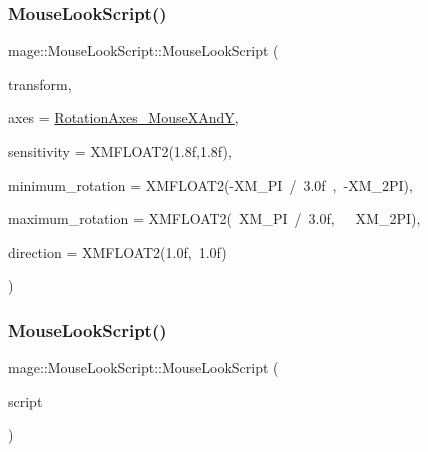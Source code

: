 \subsubsection{\texorpdfstring{Mouse\+Look\+Script()}{MouseLookScript()}\hspace{0.1cm}{\footnotesize\ttfamily [1/3]}}
{\footnotesize\ttfamily mage\+::\+Mouse\+Look\+Script\+::\+Mouse\+Look\+Script (\begin{DoxyParamCaption}\item[{Transform $\ast$}]{transform,  }\item[{\hyperlink{namespacemage_a548e5c31b08a1078841ed21948f5bf4c}{Rotation\+Axes}}]{axes = {\ttfamily \hyperlink{namespacemage_a548e5c31b08a1078841ed21948f5bf4ca6b0dd5cb81f83efb4c2b36456d84750d}{Rotation\+Axes\+\_\+\+Mouse\+X\+AndY}},  }\item[{const X\+M\+F\+L\+O\+A\+T2 \&}]{sensitivity = {\ttfamily XMFLOAT2(1.8f,1.8f)},  }\item[{const X\+M\+F\+L\+O\+A\+T2 \&}]{minimum\+\_\+rotation = {\ttfamily XMFLOAT2(-\/XM\+\_\+PI~/~3.0f~,~-\/XM\+\_\+2PI)},  }\item[{const X\+M\+F\+L\+O\+A\+T2 \&}]{maximum\+\_\+rotation = {\ttfamily XMFLOAT2(~XM\+\_\+PI~/~3.0f,~~~XM\+\_\+2PI)},  }\item[{const X\+M\+F\+L\+O\+A\+T2 \&}]{direction = {\ttfamily XMFLOAT2(1.0f,~1.0f)} }\end{DoxyParamCaption})\hspace{0.3cm}{\ttfamily [explicit]}}

\hypertarget{classmage_1_1_mouse_look_script_a54bd09419068ab61c4dd6fda412771d3}{}\label{classmage_1_1_mouse_look_script_a54bd09419068ab61c4dd6fda412771d3} 
\subsubsection{\texorpdfstring{Mouse\+Look\+Script()}{MouseLookScript()}\hspace{0.1cm}{\footnotesize\ttfamily [2/3]}}
{\footnotesize\ttfamily mage\+::\+Mouse\+Look\+Script\+::\+Mouse\+Look\+Script (\begin{DoxyParamCaption}\item[{const \hyperlink{classmage_1_1_mouse_look_script}{Mouse\+Look\+Script} \&}]{script }\end{DoxyParamCaption})\hspace{0.3cm}{\ttfamily [delete]}}

